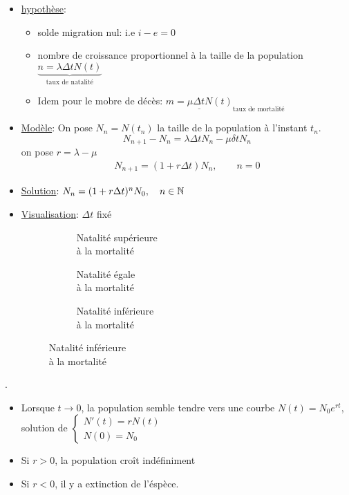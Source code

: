 \begin{itemize}
    \item \underline{hypothèse}:
        \begin{itemize}
            \item solde migration nul: i.e $i - e = 0$
            \item nombre de croissance proportionnel à la taille de la population  $\underbrace{n = \lambda \Delta t N(t)}_{\text{taux de natalité}}$
            \item Idem pour le mobre de décès: $\underline{m = \mu \Delta t N(t)}_{\text{taux de mortalité}}$
        \end{itemize}
    \item \underline{Modèle}: On pose $N_n = N(t_n)$ la taille de la population à l'instant  $t_n$.
         \[
             N_{n+1} - N_{n} = \lambda \Delta t N_n - \mu \delta t N_n
        \] 
        on pose $r = \lambda - \mu$
         \begin{align}
             N_{n+1} = ( 1 + r\Delta t )N_n, \qquad n = 0 
        \end{align}
    \item \underline{Solution}: $N_n = (1 + r \Delta t)^{n}N_0, \quad n \in \mathbb{N}$
    \item \underline{Visualisation}: $\Delta t$ fixé
\begin{figure}[H]
   \centering 
   \begin{subfigure}{0.3\textwidth}
       \centering
       \caption{Natalité supérieure\\ à la mortalité}
       \label{fig:natalite-superieure}
   \end{subfigure}
   \begin{subfigure}{0.3\textwidth}
       \centering
       \caption{Natalité égale\\ à la mortalité}
       \label{fig:natalite-egale}
   \end{subfigure}
   \begin{subfigure}{0.3\textwidth}
       \centering
       \caption{Natalité inférieure\\ à la mortalité}
       \label{fig:natalite-inferieur}
   \end{subfigure}
\end{figure}
\end{itemize}
\begin{property}.
    \begin{itemize}
        \item Lorsque $t \to 0$, la population semble tendre vers une courbe $N(t) = N_0 e^{rt}$, solution de $\begin{cases}
                N'(t) = rN(t)\\
                N(0) = N_0
            \end{cases}$ 
        \item Si $r > 0$, la population croît indéfiniment
        \item Si  $r < 0$, il y a extinction de l'éspèce.
    \end{itemize} 
\end{property}
